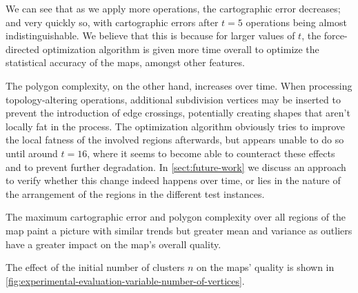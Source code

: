 We can see that as we apply more operations, the cartographic error decreases; and very quickly so, with cartographic errors after $t = 5$ operations being almost indistinguishable.
We believe that this is because for larger values of $t$, the force-directed optimization algorithm is given more time overall to optimize the statistical accuracy of the maps, amongst other features.

The polygon complexity, on the other hand, increases over time.
When processing topology-altering operations, additional subdivision vertices may be inserted to prevent the introduction of edge crossings, potentially creating shapes that aren't locally fat in the process.
The optimization algorithm obviously tries to improve the local fatness of the involved regions afterwards, but appears unable to do so until around $t = 16$, where it seems to become able to counteract these effects and to prevent further degradation.
In \cref{sect:future-work} we discuss an approach to verify whether this change indeed happens over time, or lies in the nature of the arrangement of the regions in the different test instances.

The maximum cartographic error and polygon complexity over all regions of the map paint a picture with similar trends but greater mean and variance as outliers have a greater impact on the map's overall quality.

\vspace{1cm}

The effect of the initial number of clusters $n$ on the maps' quality is shown in \cref{fig:experimental-evaluation-variable-number-of-vertices}.

